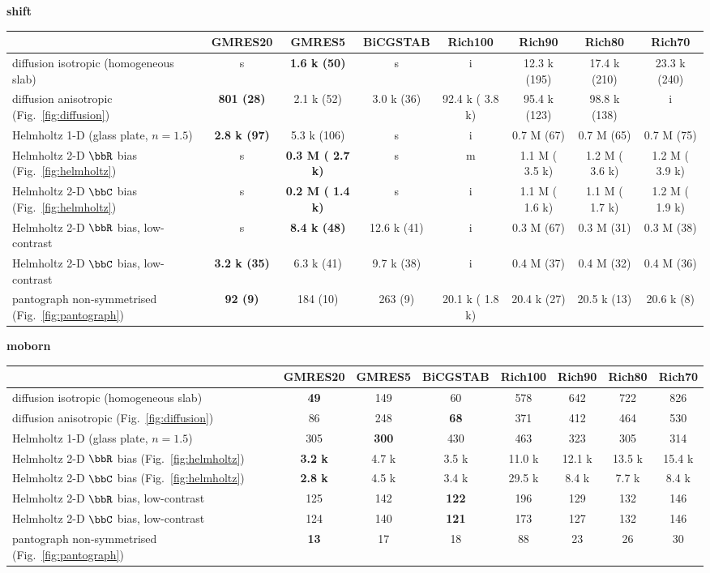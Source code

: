 \textbf{shift}\\
\begin{tabular}{l|c|c|c|c|c|c|c}& GMRES20& GMRES5& BiCGSTAB& Rich100& Rich90& Rich80& Rich70\\
\hline
diffusion isotropic (homogeneous slab)  & s & \textbf{   1.6 k (50)} & s & i &   12.3 k (195) &   17.4 k (210) &   23.3 k (240)\\
diffusion anisotropic (Fig.~\ref{fig:diffusion})  & \textbf{801 (28)} &    2.1 k (52) &    3.0 k (36) &   92.4 k (   3.8 k) &   95.4 k (123) &   98.8 k (138) & i\\
Helmholtz 1-D (glass plate, $n=1.5$)  & \textbf{   2.8 k (97)} &    5.3 k (106) & s & i &    0.7 M (67) &    0.7 M (65) &    0.7 M (75)\\
Helmholtz 2-D $\bbR$ bias (Fig.~\ref{fig:helmholtz})  & s & \textbf{   0.3 M (   2.7 k)} & s & m &    1.1 M (   3.5 k) &    1.2 M (   3.6 k) &    1.2 M (   3.9 k)\\
Helmholtz 2-D $\bbC$ bias (Fig.~\ref{fig:helmholtz})  & s & \textbf{   0.2 M (   1.4 k)} & s & i &    1.1 M (   1.6 k) &    1.1 M (   1.7 k) &    1.2 M (   1.9 k)\\
Helmholtz 2-D $\bbR$ bias, low-contrast  & s & \textbf{   8.4 k (48)} &   12.6 k (41) & i &    0.3 M (67) &    0.3 M (31) &    0.3 M (38)\\
Helmholtz 2-D $\bbC$ bias, low-contrast  & \textbf{   3.2 k (35)} &    6.3 k (41) &    9.7 k (38) & i &    0.4 M (37) &    0.4 M (32) &    0.4 M (36)\\
pantograph non-symmetrised (Fig.~\ref{fig:pantograph})  & \textbf{92 (9)} & 184 (10) & 263 (9) &   20.1 k (   1.8 k) &   20.4 k (27) &   20.5 k (13) &   20.6 k (8)\\
\end{tabular}


\textbf{moborn}\\
\begin{tabular}{l|c|c|c|c|c|c|c}& GMRES20& GMRES5& BiCGSTAB& Rich100& Rich90& Rich80& Rich70\\
\hline
diffusion isotropic (homogeneous slab)  & \textbf{49} & 149 & 60 & 578 & 642 & 722 & 826\\
diffusion anisotropic (Fig.~\ref{fig:diffusion})  & 86 & 248 & \textbf{68} & 371 & 412 & 464 & 530\\
Helmholtz 1-D (glass plate, $n=1.5$)  & 305 & \textbf{300} & 430 & 463 & 323 & 305 & 314\\
Helmholtz 2-D $\bbR$ bias (Fig.~\ref{fig:helmholtz})  & \textbf{   3.2 k} &    4.7 k &    3.5 k &   11.0 k &   12.1 k &   13.5 k &   15.4 k\\
Helmholtz 2-D $\bbC$ bias (Fig.~\ref{fig:helmholtz})  & \textbf{   2.8 k} &    4.5 k &    3.4 k &   29.5 k &    8.4 k &    7.7 k &    8.4 k\\
Helmholtz 2-D $\bbR$ bias, low-contrast  & 125 & 142 & \textbf{122} & 196 & 129 & 132 & 146\\
Helmholtz 2-D $\bbC$ bias, low-contrast  & 124 & 140 & \textbf{121} & 173 & 127 & 132 & 146\\
pantograph non-symmetrised (Fig.~\ref{fig:pantograph})  & \textbf{13} & 17 & 18 & 88 & 23 & 26 & 30\\
\end{tabular}


